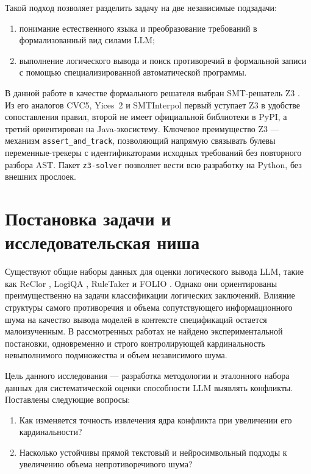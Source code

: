 Такой подход позволяет разделить задачу на две независимые подзадачи:
\begin{enumerate}
    \item понимание естественного языка и преобразование требований в формализованный вид силами LLM;
    \item выполнение логического вывода и поиск противоречий в формальной записи с помощью специализированной автоматической программы.
\end{enumerate}

В данной работе в качестве формального решателя выбран SMT-решатель Z3 \cite{demoura2008}. Из его аналогов CVC5, Yices~2 и SMTInterpol первый уступает Z3 в удобстве сопоставления правил, второй не имеет официальной библиотеки в PyPI, а третий ориентирован на Java-экосистему. Ключевое преимущество Z3 — механизм \texttt{assert\_and\_track}, позволяющий напрямую связывать булевы переменные-трекеры с идентификаторами исходных требований без повторного разбора AST. Пакет \texttt{z3-solver} позволяет вести всю разработку на Python, без внешних прослоек.



\section{Постановка задачи и исследовательская ниша}
Существуют общие наборы данных для оценки логического вывода LLM, такие как ReClor \cite{yu2020reclor}, LogiQA \cite{liu2020logiqa}, RuleTaker \cite{clark2020ruletaker} и FOLIO \cite{han2024folio}. Однако они ориентированы преимущественно на задачи классификации логических заключений. Влияние структуры самого противоречия и объема сопутствующего информационного шума на качество вывода моделей в контексте спецификаций остается малоизученным. В рассмотренных работах не найдено экспериментальной постановки, одновременно и строго контролирующей кардинальность невыполнимого подмножества и объем независимого шума.

Цель данного исследования — разработка методологии и эталонного набора данных для систематической оценки способности LLM выявлять конфликты. 
Поставлены следующие вопросы:
\begin{enumerate}
    \item Как изменяется точность извлечения ядра конфликта при увеличении его кардинальности?
    \item Насколько устойчивы прямой текстовый и нейросимвольный подходы к увеличению объема непротиворечивого шума?
\end{enumerate}

